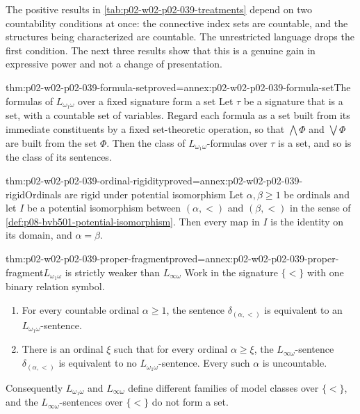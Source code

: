 The positive results in \cref{tab:p02-w02-p02-039-treatments} depend on two
countability conditions at once: the connective index sets are countable,
and the structures being characterized are countable.  The unrestricted
language drops the first condition.  The next three results show that this
is a genuine gain in expressive power and not a change of presentation.

\begin{hblemma}{thm:p02-w02-p02-039-formula-set}{proved=annex:p02-w02-p02-039-formula-set}{The formulas of \(L_{\omega_1\omega}\) over a fixed signature form a set}
Let \(\tau\) be a signature that is a set, with a countable set of
variables.  Regard each formula as a set built from its immediate
constituents by a fixed set-theoretic operation, so that \(\bigwedge\Phi\)
and \(\bigvee\Phi\) are built from the set \(\Phi\).  Then the class of
\(L_{\omega_1\omega}\)-formulas over \(\tau\) is a set, and so is the class
of its sentences.
\end{hblemma}

\begin{hblemma}{thm:p02-w02-p02-039-ordinal-rigidity}{proved=annex:p02-w02-p02-039-rigid}{Ordinals are rigid under potential isomorphism}
Let \(\alpha,\beta\geq1\) be ordinals and let \(I\) be a potential
isomorphism between \((\alpha,<)\) and \((\beta,<)\) in the sense of
\cref{def:p08-bvb501-potential-isomorphism}.  Then every map in \(I\) is
the identity on its domain, and \(\alpha=\beta\).
\end{hblemma}

\begin{hbtheorem}{thm:p02-w02-p02-039-proper-fragment}{proved=annex:p02-w02-p02-039-proper-fragment}{\(L_{\omega_1\omega}\) is strictly weaker than \(L_{\infty\omega}\)}
Work in the signature \(\{<\}\) with one binary relation symbol.
\begin{enumerate}
\item For every countable ordinal \(\alpha\geq1\), the sentence
      \(\delta_{(\alpha,<)}\) is equivalent to an
      \(L_{\omega_1\omega}\)-sentence.
\item There is an ordinal \(\xi\) such that for every ordinal
      \(\alpha\geq\xi\), the \(L_{\infty\omega}\)-sentence
      \(\delta_{(\alpha,<)}\) is equivalent to no
      \(L_{\omega_1\omega}\)-sentence.  Every such \(\alpha\) is
      uncountable.
\end{enumerate}
Consequently \(L_{\omega_1\omega}\) and \(L_{\infty\omega}\) define
different families of model classes over \(\{<\}\), and the
\(L_{\infty\omega}\)-sentences over \(\{<\}\) do not form a set.
\end{hbtheorem}

